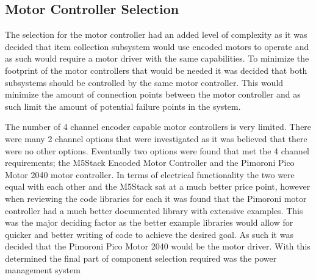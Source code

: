 \documentclass{article}
\begin{document}
\subsection{Motor Controller Selection}
The selection for the motor controller had an added level of complexity as it was decided that item collection subsystem would use encoded motors to operate and as such
would require a motor driver with the same capabilities. To minimize the footprint of the motor controllers that would be needed it was decided that both subsystems should
be controlled by the same motor controller. This would minimize the amount of connection points between the motor controller and as such limit the amount of potential
failure points in the system.
\par
The number of 4 channel encoder capable motor controllers is very limited. There were many 2 channel options that were investigated as it was believed that there were no
other options. Eventually two options were found that met the 4 channel requirements; the M5Stack Encoded Motor Controller and the Pimoroni Pico Motor 2040 motor
controller. In terms of electrical functionality the two were equal with each other and the M5Stack sat at a much better price point, however when reviewing the code
libraries for each it was found that the Pimoroni motor controller had a much better documented library with extensive examples. This was the major deciding factor as
the better example libraries would allow for quicker and better writing of code to achieve the desired goal. As such it was decided that the Pimoroni Pico Motor 2040
would be the motor driver. With this determined the final part of component selection required was the power management system
\par
\end{document}

